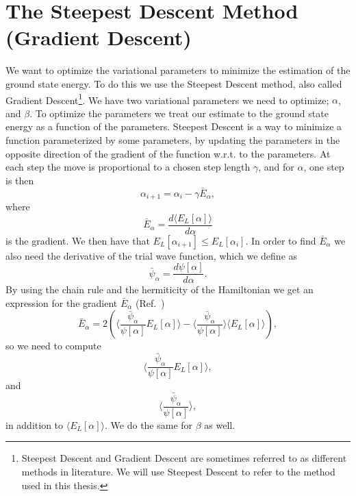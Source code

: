 \documentclass[../main.tex]{subfiles}
\begin{document}
\section{The Steepest Descent Method (Gradient Descent)}\label{sec:SteepestDescent}
We want to optimize the variational parameters to minimize the estimation of the ground state energy. To do this we use the Steepest Descent method, also called Gradient Descent\footnote{Steepest Descent and Gradient Descent are sometimes referred to as different methods in literature. We will use Steepest Descent to refer to the method used in this thesis.}. We have two variational parameters we need to optimize; $\alpha$, and $\beta$. To optimize the parameters we treat our estimate to the ground state energy as a function of the parameters. Steepest Descent is a way to minimize a function parameterized by some parameters, by updating the parameters in the opposite direction of the gradient of the function w.r.t. to the parameters.\cite{Ruder}
At each step the move is proportional to a chosen step length $\gamma$, and for $\alpha$, one step is then
\begin{equation}\label{eq: SteepestDesc}
    \alpha_{i+1} = \alpha_i - \gamma\bar{E}_\alpha,
\end{equation}
where
\begin{equation}
    \bar{E}_\alpha = \frac{d\langle E_L[\alpha]\rangle}{d\alpha}
\end{equation}
is the gradient. We then have that $E_L[\alpha_{i+1}]\leq E_L[\alpha_i]$. In order to find $\bar{E}_\alpha$ we also need the derivative of the trial wave function, which we define as
\begin{equation}
    \bar{\psi}_\alpha = \frac{d\psi[\alpha]}{d\alpha}.
\end{equation}
By using the chain rule and the hermiticity of the Hamiltonian we get an expression for the gradient $\bar{E}_\alpha$ (Ref.~\cite{FYS4411-CG})
\begin{equation}\label{eq: energygradient}
 \bar{E}_\alpha = 2 \left( \Bigr\langle \frac{\bar{\psi}_\alpha}{\psi[\alpha]} E_L[\alpha] \Bigr\rangle 
 - \Bigr\langle \frac{\bar{\psi}_\alpha}{\psi[\alpha]}\Bigr\rangle \langle E_L[\alpha] \rangle   \right),
\end{equation}
so we need to compute
\begin{equation}\label{eq: psiDerEn}
    \Bigr\langle \frac{\bar{\psi}_\alpha}{\psi[\alpha]} E_L[\alpha] \Bigr\rangle,
\end{equation}
and
\begin{equation}\label{eq: psiDer}
    \Bigr\langle \frac{\bar{\psi}_\alpha}{\psi[\alpha]}\Bigr\rangle,
\end{equation}
in addition to $\langle E_L[\alpha] \rangle$. We do the same for $\beta$ as well.
\end{document}
